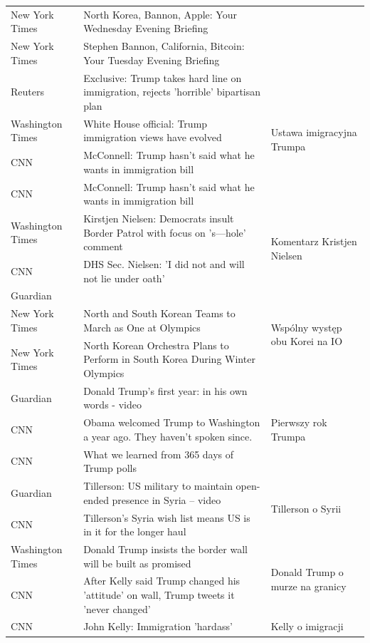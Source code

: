 \begin{center}
\begin{longtable}{|p{}|p{}|p{}|}
    New York Times & North Korea, Bannon, Apple: Your Wednesday Evening Briefing
 & \\
    New York Times & Stephen Bannon, California, Bitcoin: Your Tuesday Evening Briefing
 & \\ \hline
 Reuters & Exclusive: Trump takes hard line on immigration, rejects 'horrible' bipartisan plan
 & \multirow{4}{*}{Ustawa imigracyjna Trumpa} \\
 Washington Times & White House official: Trump immigration views have evolved
 & \\
 CNN & McConnell:  Trump hasn't said what he wants in immigration bill 
& \\
 CNN & McConnell:  Trump hasn't said what he wants in immigration bill 
 & \\ \hline
 Washington Times & Kirstjen Nielsen: Democrats insult Border Patrol with focus on 's---hole' comment
 & \multirow{2}{*}{Komentarz Kristjen Nielsen} \\
 CNN & DHS Sec. Nielsen: 'I did not and will not lie under oath'
 & \\ \hline
 Guardian & & \multirow{3}{*}{Wspólny występ obu Korei na IO} \\
 New York Times & North and South Korean Teams to March as One at Olympics
 & \\
 New York Times & North Korean Orchestra Plans to Perform in South Korea During Winter Olympics
 & \\ \hline
 Guardian & Donald Trump's first year: in his own words - video
 & \multirow{3}{*}{Pierwszy rok Trumpa} \\
 CNN & Obama welcomed Trump to Washington a year ago. They haven't spoken since.
 & \\
 CNN & What we learned from 365 days of Trump polls
 & \\ \hline
 Guardian & Tillerson: US military to maintain open-ended presence in Syria – video
 & \multirow{2}{*}{Tillerson o Syrii} \\
 CNN & Tillerson's Syria wish list means US is in it for the longer haul 
 & \\ \hline
 Washington Times & Donald Trump insists the border wall will be built as promised & \multirow{2}{*}{Donald Trump o murze na granicy} \\
 CNN & After Kelly said Trump changed his 'attitude' on wall, Trump tweets it 'never changed'
 & \\ \hline
 CNN & John Kelly: Immigration 'hardass'
 & \multirow{2}{*}{Kelly o imigracji} \\

\end{longtable}
\end{center}
